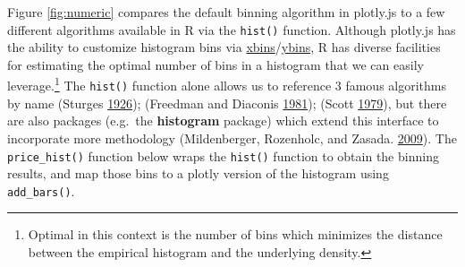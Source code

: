 \documentclass[12pt,]{isuthesis}
\newenvironment{Shaded}{\begin{snugshade}}{\end{snugshade}}
\newcommand{\KeywordTok}[1]{\textcolor[rgb]{0.13,0.29,0.53}{\textbf{{#1}}}}
\newcommand{\DataTypeTok}[1]{\textcolor[rgb]{0.13,0.29,0.53}{{#1}}}
\newcommand{\DecValTok}[1]{\textcolor[rgb]{0.00,0.00,0.81}{{#1}}}
\newcommand{\StringTok}[1]{\textcolor[rgb]{0.31,0.60,0.02}{{#1}}}
\newcommand{\OtherTok}[1]{\textcolor[rgb]{0.56,0.35,0.01}{{#1}}}
\newcommand{\NormalTok}[1]{{#1}}
\let\rmarkdownfootnote\footnote%
\def\footnote{\protect\rmarkdownfootnote}
\begin{document}
Figure \ref{fig:numeric} compares the default binning algorithm in
plotly.js to a few different algorithms available in R via the
\texttt{hist()} function. Although plotly.js has the ability to
customize histogram bins via
\href{https://plot.ly/r/reference/\#histogram-xbins}{xbins}/\href{https://plot.ly/r/reference/\#histogram-ybins}{ybins},
R has diverse facilities for estimating the optimal number of bins in a
histogram that we can easily leverage.\footnote{Optimal in this context
  is the number of bins which minimizes the distance between the
  empirical histogram and the underlying density.} The \texttt{hist()}
function alone allows us to reference 3 famous algorithms by name
(Sturges \protect\hyperlink{ref-Sturges}{1926}); (Freedman and Diaconis
\protect\hyperlink{ref-FD}{1981}); (Scott
\protect\hyperlink{ref-hist-scott}{1979}), but there are also packages
(e.g.~the \textbf{histogram} package) which extend this interface to
incorporate more methodology (Mildenberger, Rozenholc, and Zasada.
\protect\hyperlink{ref-histogram}{2009}). The \texttt{price\_hist()}
function below wraps the \texttt{hist()} function to obtain the binning
results, and map those bins to a plotly version of the histogram using
\texttt{add\_bars()}.

\begin{Shaded}
\end{Shaded}
\end{document}
